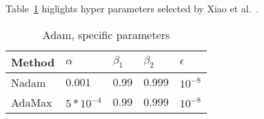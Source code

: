 Table~\ref{tab:ensemble-params} higlights hyper parameters selected by Xiao et al.~\cite{xiao_accurate_2019}.
\begin{center}
    \begin{table}[htbp]
    \caption{Adam, specific parameters}
    \label{tab:ensemble-params}
\begin{tabular}{ p{6.0cm} p{1.5cm} p{1.5cm} p{1.5cm} p{1.5cm}  }
    \hline
    Method     & $\alpha$ & $\beta_1 $ & $\beta_2$ &   $\epsilon$ \\
    \hline
    Nadam
            & $0.001$ & $0.99$ & $0.999$ & $10^{-8}$ \\%
    AdaMax
            & $5*10^{-4}$ & $0.99$ & $0.999$ & $10^{-8}$ \\%
    
    \hline
\end{tabular}
    \end{table}
\end{center}